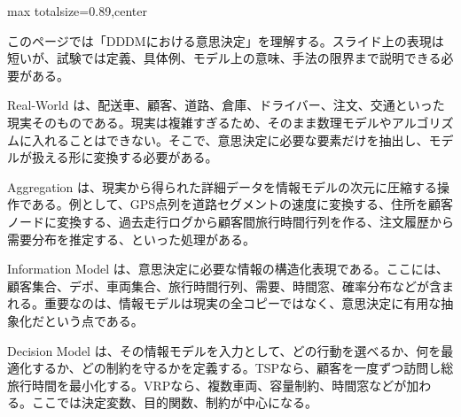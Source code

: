 \begin{minipage}[t]{0.58\textwidth}
\begin{adjustbox}{max totalsize={\textwidth}{0.89\textheight},center}
\begin{minipage}{\textwidth}\scriptsize
{}このページでは「DDDMにおける意思決定」を理解する。スライド上の表現は短いが、試験では定義、具体例、モデル上の意味、手法の限界まで説明できる必要がある。\par
Real-World は、配送車、顧客、道路、倉庫、ドライバー、注文、交通といった現実そのものである。現実は複雑すぎるため、そのまま数理モデルやアルゴリズムに入れることはできない。そこで、意思決定に必要な要素だけを抽出し、モデルが扱える形に変換する必要がある。\par
Aggregation は、現実から得られた詳細データを情報モデルの次元に圧縮する操作である。例として、GPS点列を道路セグメントの速度に変換する、住所を顧客ノードに変換する、過去走行ログから顧客間旅行時間行列を作る、注文履歴から需要分布を推定する、といった処理がある。\par
Information Model は、意思決定に必要な情報の構造化表現である。ここには、顧客集合、デポ、車両集合、旅行時間行列、需要、時間窓、確率分布などが含まれる。重要なのは、情報モデルは現実の全コピーではなく、意思決定に有用な抽象化だという点である。\par
Decision Model は、その情報モデルを入力として、どの行動を選べるか、何を最適化するか、どの制約を守るかを定義する。TSPなら、顧客を一度ずつ訪問し総旅行時間を最小化する。VRPなら、複数車両、容量制約、時間窓などが加わる。ここでは決定変数、目的関数、制約が中心になる。\par

\end{minipage}
\end{adjustbox}
\end{minipage}
